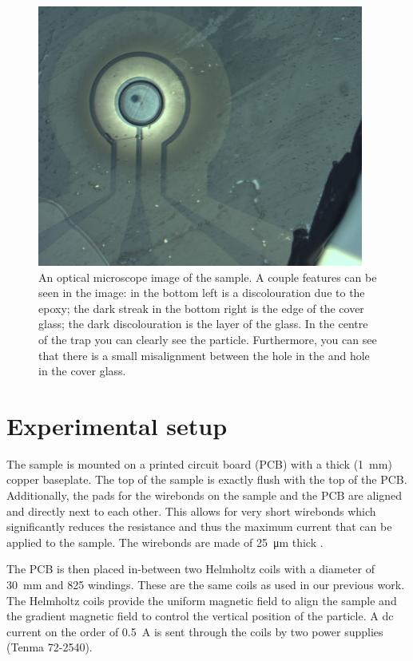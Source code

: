 \begin{figure}
    \centering
    \includegraphics{figures/sample/trap_optical_microscope.pdf}
    \caption{An optical microscope image of the sample. A couple features can be seen in the image: in the bottom left is a discolouration due to the epoxy; the dark streak in the bottom right is the edge of the cover glass; the dark discolouration is the  layer of the glass. In the centre of the trap you can clearly see the  particle. Furthermore, you can see that there is a small misalignment between the hole in the  and hole in the cover glass.}
    \label{fig:optical-microscope-image-sample}
\end{figure}

\section{Experimental setup}
The sample is mounted on a printed circuit board (PCB) with a thick (\qty{1}{\mm}) copper baseplate. The top of the sample is exactly flush with the top of the PCB. Additionally, the pads for the wirebonds on the sample and the PCB are aligned and directly next to each other. This allows for very short wirebonds which significantly reduces the resistance and thus the maximum current that can be applied to the sample. The wirebonds are made of \qty{25}{\um} thick .

The PCB is then placed in-between two Helmholtz coils with a diameter of \qty{30}{\mm} and 825 windings. These are the same coils as used in our previous work\cite{eli,mart}. The Helmholtz coils provide the uniform magnetic field to align the sample and the gradient magnetic field to control the vertical position of the particle. A dc current on the order of \qty{0.5}{\ampere} is sent through the coils by two power supplies (Tenma 72-2540).

